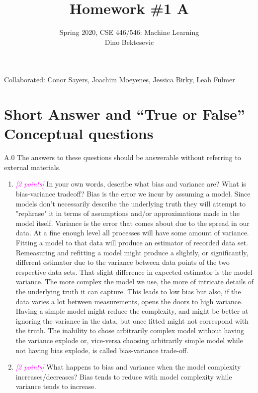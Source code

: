 \documentclass{article}
\date{{}}
\newcommand{\1}{\mathbf{1}}
\newcommand{\points}[1]{\small\textcolor{magenta}{\emph{[#1 points]}} \normalsize}
\begin{document}
\title{Homework \#1 A}
\author{\normalsize{Spring 2020, CSE 446/546: Machine Learning}\\
\normalsize{Dino Bektesevic}}
\maketitle

Collaborated: Conor Sayers, Joachim Moeyenes, Jessica Birky, Leah Fulmer

\section*{Short Answer and “True or False” Conceptual questions}
A.0 The answers to these questions should be answerable without referring to external materials.
\begin{enumerate}
    \item \points{2} In your own words, describe what bias and variance are? What is bias-variance tradeoff? \newline
    Bias is the error we incur by assuming a model. Since models don't necessarily describe the underlying truth they will attempt to "rephrase" it in terms of assumptions and/or approximations made in the model itself. Variance is the error that comes about due to the spread in our data. At a fine enough level all processes will have some amount of variance. Fitting a model to that data will produce an estimator of recorded data set. Remeasuring and refitting a model might produce a slightly, or significantly, different estimator due to the variance between data points of the two respective data sets. That slight difference in expected estimator is the model variance. \newline
    The more complex the model we use, the more of intricate details of the underlying truth it can capture. This leads to low bias but also, if the data varies a lot between measurements, opens the doors to high variance. Having a simple model might reduce the complexity, and might be better at ignoring the variance in the data, but once fitted might not correspond with the truth. The inability to chose arbitrarily complex model without having the variance explode or, vice-versa choosing arbitrarily simple model while not having bias explode, is called bias-variance trade-off.

    \item \points{2} What happens to bias and variance when the model complexity increases/decreases? \newline
    Bias tends to reduce with model complexity while variance tends to increase. 


\end{enumerate}
\end{document}
